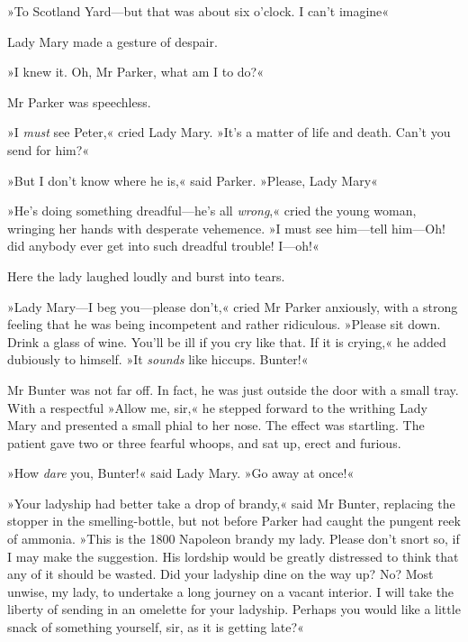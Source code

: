 »To Scotland Yard\allowbreak---\allowbreak but that was about six o'clock. I can't imagine\longdash«

Lady Mary made a gesture of despair.

»I knew it. Oh, Mr Parker, what am I to do?«

Mr Parker was speechless.

»I \textit{must} see Peter,« cried Lady Mary. »It's a matter of life and death. Can't you send for him?«

»But I don't know where he is,« said Parker. »Please, Lady Mary\longdash«

»He's doing something dreadful\allowbreak---\allowbreak he's all \textit{wrong},« cried the young woman, wringing her hands with desperate vehemence. »I must see him\allowbreak---\allowbreak tell him\allowbreak---\allowbreak Oh! did anybody ever get into such dreadful trouble! I\allowbreak---\allowbreak oh!\longdash«

Here the lady laughed loudly and burst into tears.

»Lady Mary\allowbreak---\allowbreak I beg you\allowbreak---\allowbreak please don't,« cried Mr Parker anxiously, with a strong feeling that he was being incompetent and rather ridiculous.  »Please sit down. Drink a glass of wine. You'll be ill if you cry like that. If it is crying,« he added dubiously to himself. »It \textit{sounds} like hiccups. Bunter!«

Mr Bunter was not far off. In fact, he was just outside the door with a small tray. With a respectful »Allow me, sir,« he stepped forward to the writhing Lady Mary and presented a small phial to her nose. The effect was startling. The patient gave two or three fearful whoops, and sat up, erect and furious.

»How \textit{dare} you, Bunter!« said Lady Mary. »Go away at once!«

»Your ladyship had better take a drop of brandy,« said Mr Bunter, replacing the stopper in the smelling-bottle, but not before Parker had caught the pungent reek of ammonia. »This is the 1800 Napoleon brandy my lady. Please don't snort so, if I may make the suggestion.  His lordship would be greatly distressed to think that any of it should be wasted. Did your ladyship dine on the way up? No? Most unwise, my lady, to undertake a long journey on a vacant interior. I will take the liberty of sending in an omelette for your ladyship. Perhaps you would like a little snack of something yourself, sir, as it is getting late?«

